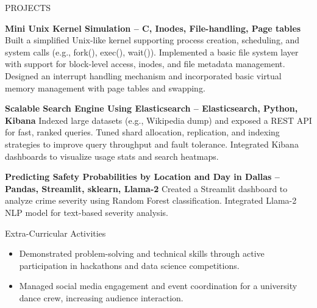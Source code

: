 \documentclass{resume}
\begin{document}
\begin{rSection}{PROJECTS}
\vspace{-1.25em}
\item \textbf{Mini Unix Kernel Simulation – C, Inodes, File-handling, Page tables}
    Built a simplified Unix-like kernel supporting process creation, scheduling, and system calls (e.g., fork(), exec(), wait()). Implemented a basic file system layer with support for block-level access, inodes, and file metadata management. Designed an interrupt handling mechanism and incorporated basic virtual memory management with page tables and swapping.
\item \textbf{Scalable Search Engine Using Elasticsearch – Elasticsearch, Python, Kibana}
    Indexed large datasets (e.g., Wikipedia dump) and exposed a REST API for fast, ranked queries. Tuned shard allocation, replication, and indexing strategies to improve query throughput and fault tolerance. Integrated Kibana dashboards to visualize usage stats and search heatmaps.
\item \textbf{Predicting Safety Probabilities by Location and Day in Dallas – Pandas, Streamlit, sklearn, Llama-2}
    Created a Streamlit dashboard to analyze crime severity using Random Forest classification. Integrated Llama-2 NLP model for text-based severity analysis.
\end{rSection}
\begin{rSection}{Extra-Curricular Activities}
\begin{itemize}
    \item Demonstrated problem-solving and technical skills through active participation in hackathons and data science competitions.
    \item Managed social media engagement and event coordination for a university dance crew, increasing audience interaction.
\end{itemize}
\end{rSection}
\end{document}
